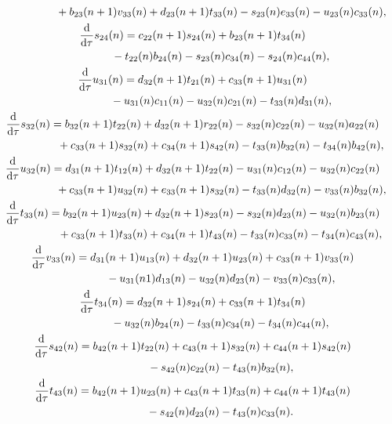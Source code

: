 \documentclass[10pt,a4paper]{amsart}
\numberwithin{equation}{section}
\begin{document}
\begin{gather}
\hphantom{\frac{\mathrm{d}}{\mathrm{d}\tau}u_{23}(n)=}{}
	+b_{23}(n+1)v_{33}(n)+d_{23}(n+1)t_{33}(n)-s_{23}(n)e_{33}(n)-u_{23}(n)c_{33}(n),\label{eq-3.7}
\\
	\frac{\mathrm{d}}{\mathrm{d}\tau}s_{24}(n)=c_{22}(n+1)s_{24}(n)+b_{23}(n+1)t_{34}(n)\nonumber\\
\hphantom{\frac{\mathrm{d}}{\mathrm{d}\tau}s_{24}(n)=}{}
	-t_{22}(n)b_{24}(n)-s_{23}(n)c_{34}(n)-s_{24}(n)c_{44}(n),\label{eq-3.8}
\\
	\frac{\mathrm{d}}{\mathrm{d}\tau}u_{31}(n)=d_{32}(n+1)t_{21}(n)+c_{33}(n+1)u_{31}(n)\nonumber\\
\hphantom{\frac{\mathrm{d}}{\mathrm{d}\tau}u_{31}(n)=}{}
	-u_{31}(n)c_{11}(n)-u_{32}(n)c_{21}(n)-t_{33}(n)d_{31}(n), \label{eq-3.9}
\\
	\frac{\mathrm{d}}{\mathrm{d}\tau}s_{32}(n)=b_{32}(n+1)t_{22}(n)+d_{32}(n+1)r_{22}(n)-s_{32}(n)c_{22}(n)-u_{32}(n)a_{22}(n) \nonumber\\
\hphantom{\frac{\mathrm{d}}{\mathrm{d}\tau}s_{32}(n)=}{}
	+c_{33}(n+1)s_{32}(n)+c_{34}(n+1)s_{42}(n)-t_{33}(n)b_{32}(n)-t_{34}(n)b_{42 }(n), \label{eq-3.10}
\\
	\frac{\mathrm{d}}{\mathrm{d}\tau}u_{32}(n)=d_{31}(n+1)t_{12}(n)+d_{32}(n+1)t_{22}(n)-u_{31}(n)c_{12}(n)-u_{32}(n)c_{22}(n) \nonumber\\
\hphantom{\frac{\mathrm{d}}{\mathrm{d}\tau}u_{32}(n)=}{}
	+c_{33}(n+1)u_{32}(n)+e_{33}(n+1)s_{32}(n)-t_{33}(n)d_{32}(n)-v_{33}(n)b_{32}(n),\label{eq-3.11}
\\
	\frac{\mathrm{d}}{\mathrm{d}\tau}t_{33}(n)=b_{32}(n+1)u_{23}(n)+d_{32}(n+1)s_{23}(n)-s_{32}(n)d_{23}(n)-u_{32}(n)b_{23}(n) \nonumber\\
\hphantom{\frac{\mathrm{d}}{\mathrm{d}\tau}t_{33}(n)=}{}
	+c_{33}(n+1)t_{33}(n)+c_{34}(n+1)t_{43}(n)-t_{33}(n)c_{33}(n)-t_{34}(n)c_{43}(n), \label{eq-3.12}
\\
	\frac{\mathrm{d}}{\mathrm{d}\tau}v_{33}(n)=d_{31}(n+1)u_{13}(n)+d_{32}(n+1)u_{23}(n)+c_{33}(n+1)v_{33}(n) \nonumber\\
\hphantom{\frac{\mathrm{d}}{\mathrm{d}\tau}v_{33}(n)=}{}
	-u_{31}(n1)d_{13}(n)-u_{32}(n)d_{23}(n)-v_{33}(n)c_{33}(n), \label{eq-3.13}
\\
	\frac{\mathrm{d}}{\mathrm{d}\tau}t_{34}(n)=d_{32}(n+1)s_{24}(n)+c_{33}(n+1)t_{34}(n)\nonumber\\
\hphantom{\frac{\mathrm{d}}{\mathrm{d}\tau}t_{34}(n)=}{}
	-u_{32}(n)b_{24}(n)-t_{33}(n)c_{34}(n)-t_{34}(n)c_{44}(n), \label{eq-3.14}
\\
	\frac{\mathrm{d}}{\mathrm{d}\tau}s_{42}(n)=b_{42}(n+1)t_{22}(n)+c_{43}(n+1)s_{32}(n)+c_{44}(n+1)s_{42}(n)\nonumber\\
\hphantom{\frac{\mathrm{d}}{\mathrm{d}\tau}s_{42}(n)=}{}
	-s_{42}(n)c_{22}(n)-t_{43}(n)b_{32}(n), \label{eq-3.15}
\\
	\frac{\mathrm{d}}{\mathrm{d}\tau}t_{43}(n)=b_{42}(n+1)u_{23}(n)+c_{43}(n+1)t_{33}(n)+c_{44}(n+1)t_{43}(n)\nonumber\\
\hphantom{\frac{\mathrm{d}}{\mathrm{d}\tau}t_{43}(n)=}{}
	-s_{42}(n)d_{23}(n)-t_{43}(n)c_{33}(n) . \label{eq-3.16}
\end{gather}
\end{document}
